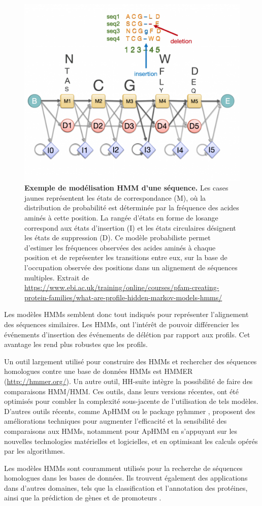 \begin{figure}[htbp]
    \centering
    \includegraphics[width=0.45\linewidth]{images/HMM_ex.png}
    \caption[Exemple de modélisation HMM d'une séquence]{\textbf{Exemple de modélisation HMM d'une séquence.} Les cases jaunes représentent les états de correspondance (M), où la distribution de probabilité est déterminée par la fréquence des acides aminés à cette position. La rangée d'états en forme de losange correspond aux états d'insertion (I) et les états circulaires désignent les états de suppression (D). Ce modèle probabiliste permet d’estimer les fréquences observées des acides aminés à chaque position et de représenter les transitions entre eux, sur la base de l’occupation observée des positions dans un alignement de séquences multiples. Extrait de \url{https://www.ebi.ac.uk/training/online/courses/pfam-creating-protein-families/what-are-profile-hidden-markov-models-hmms/}}
    \label{fig:HMM_ex}
\end{figure}

Les modèles HMMs semblent donc tout indiqués pour représenter l'alignement des séquences similaires. Les HMMs, ont l'intérêt de pouvoir différencier les événements d'insertion des événements de délétion par rapport aux profils. Cet avantage les rend plus robustes que les profils. 

Un outil largement utilisé pour construire des HMMs et rechercher des séquences homologues contre une base de données HMMs est HMMER (\url{http://hmmer.org/}). Un autre outil, HH-suite \cite{steinegger_hh-suite3_2019}  intègre la possibilité de faire des comparaisons HMM/HMM. Ces outils, dans leurs versions récentes, ont été optimisés pour combler la complexité sous-jacente de l'utilisation de tels modèles. D'autres outils récents, comme ApHMM \cite{firtina_aphmm_2024} ou le package pyhmmer \cite{larralde_pyhmmer_2023}, proposent des améliorations techniques pour augmenter l'efficacité et la sensibilité des comparaisons aux HMMs, notamment pour ApHMM en s'appuyant sur les nouvelles technologies matérielles et logicielles, et en optimisant les calculs opérés par les algorithmes.

Les modèles HMMs sont couramment utilisés pour la recherche de séquences homologues dans les bases de données. Ils trouvent également des applications dans d'autres domaines, tels que la classification et l'annotation des protéines, ainsi que la prédiction de gènes et de promoteurs \cite{dimri_hidden_2024}.

